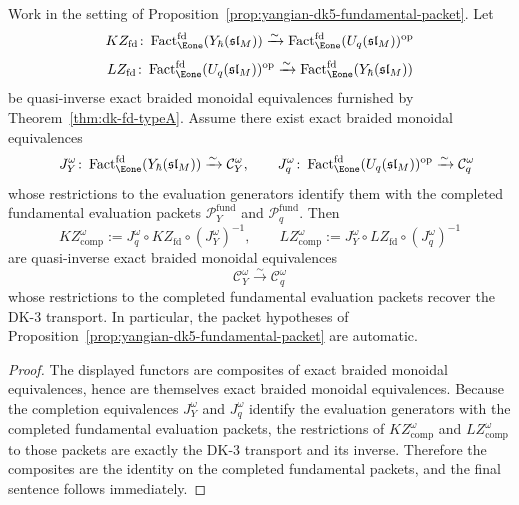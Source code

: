 \begin{proposition}
\label{prop:yangian-dk5-core-realization}
Work in the setting of
Proposition~\ref{prop:yangian-dk5-fundamental-packet}.  Let
\[
KZ_{\mathrm{fd}}\colon
\operatorname{Fact}_{\Eone}^{\mathrm{fd}}(Y_\hbar(\mathfrak{sl}_M))
\xrightarrow{\sim}
\operatorname{Fact}_{\Eone}^{\mathrm{fd}}(U_q(\mathfrak{sl}_M))^{\mathrm{op}}
\]
\[
LZ_{\mathrm{fd}}\colon
\operatorname{Fact}_{\Eone}^{\mathrm{fd}}(U_q(\mathfrak{sl}_M))^{\mathrm{op}}
\xrightarrow{\sim}
\operatorname{Fact}_{\Eone}^{\mathrm{fd}}(Y_\hbar(\mathfrak{sl}_M))
\]
be quasi-inverse exact braided monoidal equivalences furnished by
Theorem~\ref{thm:dk-fd-typeA}.  Assume there exist exact braided
monoidal equivalences
\[
\quad
J_Y^\omega\colon
\operatorname{Fact}_{\Eone}^{\mathrm{fd}}(Y_\hbar(\mathfrak{sl}_M))
\xrightarrow{\sim}
\mathcal{C}_Y^\omega,
\qquad
J_q^\omega\colon
\operatorname{Fact}_{\Eone}^{\mathrm{fd}}(U_q(\mathfrak{sl}_M))^{\mathrm{op}}
\xrightarrow{\sim}
\mathcal{C}_q^\omega
\]
whose restrictions to the evaluation generators identify them with the
completed fundamental evaluation packets
$\mathcal{P}^{\mathrm{fund}}_{Y}$ and
$\mathcal{P}^{\mathrm{fund}}_{q}$.
Then
\[
KZ^\omega_{\mathrm{comp}}
:=
J_q^\omega \circ KZ_{\mathrm{fd}} \circ (J_Y^\omega)^{-1},
\qquad
LZ^\omega_{\mathrm{comp}}
:=
J_Y^\omega \circ LZ_{\mathrm{fd}} \circ (J_q^\omega)^{-1}
\]
are quasi-inverse exact braided monoidal equivalences
\[
\mathcal{C}_Y^\omega \xrightarrow{\sim} \mathcal{C}_q^\omega
\]
whose restrictions to the completed fundamental evaluation packets
recover the DK-3 transport.  In particular, the packet hypotheses of
Proposition~\ref{prop:yangian-dk5-fundamental-packet} are automatic.
\end{proposition}

\begin{proof}
The displayed functors are composites of exact braided monoidal
equivalences, hence are themselves exact braided monoidal
equivalences.  Because the completion equivalences
$J_Y^\omega$ and $J_q^\omega$ identify the evaluation generators with
the completed fundamental evaluation packets, the restrictions of
$KZ^\omega_{\mathrm{comp}}$ and $LZ^\omega_{\mathrm{comp}}$ to those
packets are exactly the DK-3 transport and its inverse.  Therefore the
composites are the identity on the completed fundamental packets, and
the final sentence follows immediately.
\end{proof}


